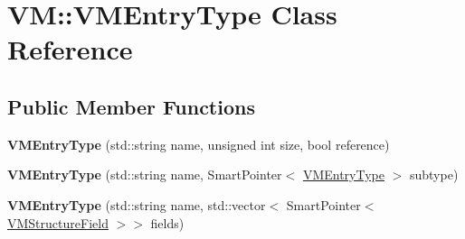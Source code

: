 \hypertarget{class_v_m_1_1_v_m_entry_type}{\section{V\-M\-:\-:V\-M\-Entry\-Type Class Reference}
\label{class_v_m_1_1_v_m_entry_type}
}
\subsection*{Public Member Functions}
\begin{DoxyCompactItemize}
\item 
\hypertarget{class_v_m_1_1_v_m_entry_type_af1c10a8b775cc7c0ab460662e98e1f5e}{{\bfseries V\-M\-Entry\-Type} (std\-::string name, unsigned int size, bool reference)}\label{class_v_m_1_1_v_m_entry_type_af1c10a8b775cc7c0ab460662e98e1f5e}

\item 
\hypertarget{class_v_m_1_1_v_m_entry_type_ab98d036a7d48fdb248ee6fad323b4b73}{{\bfseries V\-M\-Entry\-Type} (std\-::string name, Smart\-Pointer$<$ \hyperlink{class_v_m_1_1_v_m_entry_type}{V\-M\-Entry\-Type} $>$ subtype)}\label{class_v_m_1_1_v_m_entry_type_ab98d036a7d48fdb248ee6fad323b4b73}

\item 
\hypertarget{class_v_m_1_1_v_m_entry_type_a78eced662845dcab02a51fb0380f0f07}{{\bfseries V\-M\-Entry\-Type} (std\-::string name, std\-::vector$<$ Smart\-Pointer$<$ \hyperlink{class_v_m_1_1_v_m_structure_field}{V\-M\-Structure\-Field} $>$$>$ fields)}\label{class_v_m_1_1_v_m_entry_type_a78eced662845dcab02a51fb0380f0f07}


\end{DoxyCompactItemize}
